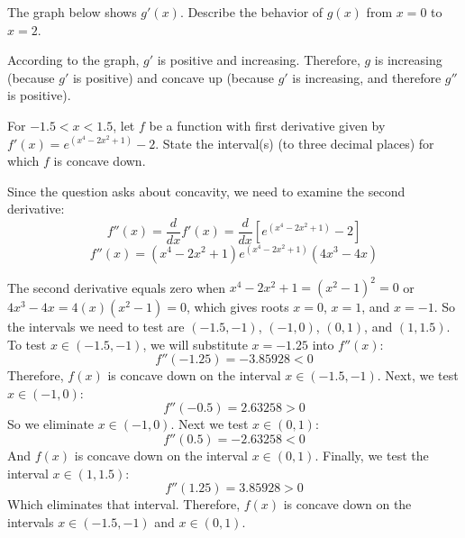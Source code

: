 \begin{Exercise}[label=concavity2]
	The graph below shows $g'(x)$. Describe the behavior of $g(x)$ from $x=0$ 
	to $x=2$. 
\end{Exercise}

\begin{Answer}[ref=concavity2]
	According to the graph, $g'$ is positive and increasing. Therefore, $g$ is 
	increasing (because $g'$ is positive) and concave up (because $g'$ is 
	increasing, and therefore $g''$ is positive).
\end{Answer}

\begin{Exercise} For $-1.5 < x < 1.5$, let $f$ be a 
function with first derivative given by $f'(x) = e^{(x^4 - 2x^2 + 1)} - 2$. State 
the interval(s) (to three decimal places) for which $f$ is concave down. 
\end{Exercise}

\begin{Answer}[ref = concavity3]
Since the question asks about concavity, we need to examine the second derivative:
$$f''(x) = \frac{d}{dx} f'(x) = \frac{d}{dx} \left[ e^{(x^4 - 2x^2 + 1)} - 2 
\right]$$
$$f''(x) = \left( x^4 - 2x^2 + 1 \right) e^{(x^4 - 2x^2 + 1)} \left(4x^3 - 4x 
\right)$$

The second derivative equals zero when $x^4 - 2x^2 + 1 = (x^2 - 1)^2 = 0$ or 
$4x^3 - 4x = 4(x)(x^2-1) = 0$, which gives roots $x = 0$, $x = 1$, and $x = 
-1$. So the intervals we need to test are $(-1.5, -1)$, $(-1, 0)$, $(0, 1)$, 
and $(1, 1.5)$. To test $x \in (-1.5, -1)$, we will substitute $x = -1.25$ 
into $f''(x)$:
$$f''(-1.25) = -3.85928 < 0$$
Therefore, $f(x)$ is concave down on the interval $x \in (-1.5, -1)$. 
Next, we test $x \in (-1, 0)$:
$$f''(-0.5) = 2.63258 > 0$$
So we eliminate $x \in (-1, 0)$. Next we test $x \in (0, 1)$:
$$f''(0.5) = -2.63258 < 0$$
And $f(x)$ is concave down on the interval $x \in (0, 1)$. Finally, we test 
the interval $x \in (1, 1.5)$:
$$f''(1.25) = 3.85928 > 0$$
Which eliminates that interval. Therefore, $f(x)$ is concave down on the 
intervals $x \in (-1.5, -1)$ and $x \in (0, 1)$. 
\end{Answer}

